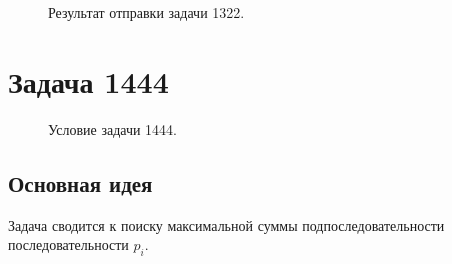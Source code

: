 \documentclass[a5paper, 10pt]{article}
\theoremstyle{definition}
\theoremstyle{plain}
\theoremstyle{remark}
\begin{document}
\begin{figure}[h]
\caption{Результат отправки задачи 1322.}
\end{figure}



\newpage
\section{Задача 1444}

\begin{figure}[h]
\caption{Условие задачи 1444.}
\end{figure}

\subsection{Основная идея}
Задача сводится к поиску максимальной суммы подпоследовательности последовательности $p_i$.
\end{document}
